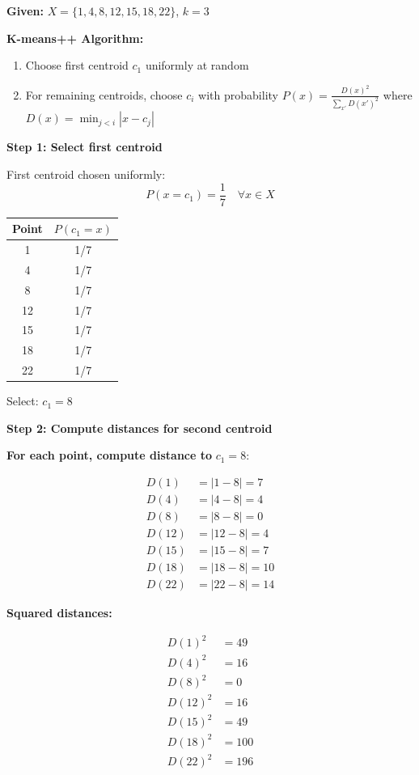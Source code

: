 \documentclass[12pt]{article}
\begin{document}
\begin{solution}
\textbf{Given:} $X = \{1, 4, 8, 12, 15, 18, 22\}$, $k = 3$

\textbf{K-means++ Algorithm:}
\begin{enumerate}
    \item Choose first centroid $c_1$ uniformly at random
    \item For remaining centroids, choose $c_i$ with probability $P(x) = \frac{D(x)^2}{\sum_{x'} D(x')^2}$
    where $D(x) = \min_{j<i} |x - c_j|$
\end{enumerate}

\textbf{Step 1: Select first centroid}

First centroid chosen uniformly:
\[
P(x = c_1) = \frac{1}{7} \quad \forall x \in X
\]

\begin{center}
\begin{tabular}{c|c}
Point & $P(c_1 = x)$ \\
\hline
1 & 1/7 \\
4 & 1/7 \\
8 & 1/7 \\
12 & 1/7 \\
15 & 1/7 \\
18 & 1/7 \\
22 & 1/7 \\
\end{tabular}
\end{center}

Select: $c_1 = 8$

\textbf{Step 2: Compute distances for second centroid}

\textbf{For each point, compute distance to } $c_1 = 8$:

\begin{align*}
D(1) &= |1 - 8| = 7 \\
D(4) &= |4 - 8| = 4 \\
D(8) &= |8 - 8| = 0 \\
D(12) &= |12 - 8| = 4 \\
D(15) &= |15 - 8| = 7 \\
D(18) &= |18 - 8| = 10 \\
D(22) &= |22 - 8| = 14
\end{align*}

\textbf{Squared distances:}

\begin{align*}
D(1)^2 &= 49 \\
D(4)^2 &= 16 \\
D(8)^2 &= 0 \\
D(12)^2 &= 16 \\
D(15)^2 &= 49 \\
D(18)^2 &= 100 \\
D(22)^2 &= 196
\end{align*}


\end{solution}
\end{document}
